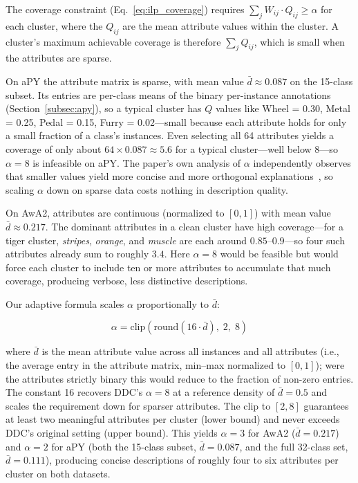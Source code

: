 The coverage constraint (Eq.~\ref{eq:ilp_coverage}) requires $\sum_j W_{ij} \cdot Q_{ij} \geq \alpha$ for each cluster, where the $Q_{ij}$ are the mean attribute values within the cluster. A cluster's maximum achievable coverage is therefore $\sum_j Q_{ij}$, which is small when the attributes are sparse.

On aPY the attribute matrix is sparse, with mean value $\bar{d} \approx 0.087$ on the 15-class subset. Its entries are per-class means of the binary per-instance annotations (Section~\ref{subsec:apy}), so a typical cluster has $Q$ values like Wheel = 0.30, Metal = 0.25, Pedal = 0.15, Furry = 0.02---small because each attribute holds for only a small fraction of a class's instances. Even selecting all 64 attributes yields a coverage of only about $64 \times 0.087 \approx 5.6$ for a typical cluster---well below $8$---so $\alpha = 8$ is infeasible on aPY. The paper's own analysis of $\alpha$ independently observes that smaller values yield more concise and more orthogonal explanations~\citep{Zhang2021}, so scaling $\alpha$ down on sparse data costs nothing in description quality.

On AwA2, attributes are continuous (normalized to $[0,1]$) with mean value $\bar{d} \approx 0.217$. The dominant attributes in a clean cluster have high coverage---for a tiger cluster, \textit{stripes}, \textit{orange}, and \textit{muscle} are each around $0.85$--$0.9$---so four such attributes already sum to roughly $3.4$. Here $\alpha = 8$ would be feasible but would force each cluster to include ten or more attributes to accumulate that much coverage, producing verbose, less distinctive descriptions.

Our adaptive formula scales $\alpha$ proportionally to $\bar{d}$:

\begin{equation}
    \alpha = \text{clip}\left(\text{round}(16 \cdot \bar{d}), \; 2, \; 8\right)
    \label{eq:alpha_adaptive}
\end{equation}

where $\bar{d}$ is the mean attribute value across all instances and all attributes (i.e., the average entry in the attribute matrix, min--max normalized to $[0,1]$); were the attributes strictly binary this would reduce to the fraction of non-zero entries. The constant 16 recovers DDC's $\alpha = 8$ at a reference density of $\bar{d} = 0.5$ and scales the requirement down for sparser attributes. The clip to $[2, 8]$ guarantees at least two meaningful attributes per cluster (lower bound) and never exceeds DDC's original setting (upper bound). This yields $\alpha = 3$ for AwA2 ($\bar{d} = 0.217$) and $\alpha = 2$ for aPY (both the 15-class subset, $\bar{d} = 0.087$, and the full 32-class set, $\bar{d} = 0.111$), producing concise descriptions of roughly four to six attributes per cluster on both datasets.

